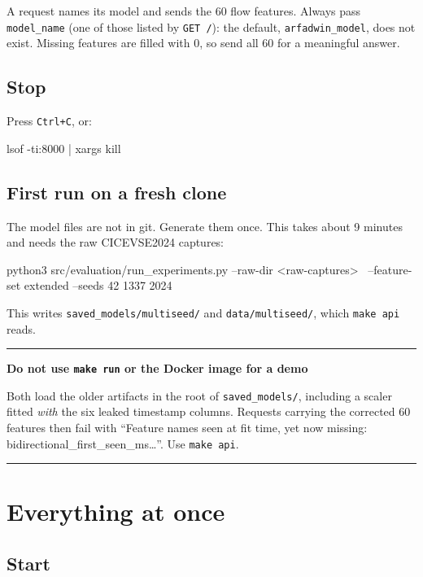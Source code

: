 \documentclass[11pt, a4paper]{article}
\newcommand{\fpath}[1]{\texttt{\small #1}}
\newenvironment{caution}[1]
  {\par\medskip\noindent\textcolor{alertred}{\rule{\textwidth}{0.8pt}}\par\nobreak
   \smallskip\noindent\textbf{\textcolor{alertred}{#1}}\par\nobreak\smallskip}
  {\par\smallskip\noindent\textcolor{alertred}{\rule{\textwidth}{0.8pt}}\par\medskip}
\begin{document}
A request names its model and sends the 60 flow features. Always pass
\texttt{model\_name} (one of those listed by \texttt{GET /}): the default,
\texttt{arfadwin\_model}, does not exist. Missing features are filled with 0, so
send all 60 for a meaningful answer.

\subsection{Stop}

Press \texttt{Ctrl+C}, or:

\begin{cmd}
lsof -ti:8000 | xargs kill
\end{cmd}

\subsection{First run on a fresh clone}
\label{sec:first-run}

The model files are not in git. Generate them once. This takes about 9 minutes
and needs the raw CICEVSE2024 captures:

\begin{cmd}
python3 src/evaluation/run_experiments.py --raw-dir <raw-captures> \
        --feature-set extended --seeds 42 1337 2024
\end{cmd}

This writes \fpath{saved\_models/multiseed/} and \fpath{data/multiseed/}, which
\texttt{make api} reads.

\begin{caution}{Do not use \texttt{make run} or the Docker image for a demo}
Both load the older artifacts in the root of \fpath{saved\_models/}, including a
scaler fitted \emph{with} the six leaked timestamp columns. Requests carrying the
corrected 60 features then fail with ``Feature names seen at fit time, yet now
missing: bidirectional\_first\_seen\_ms\ldots''. Use \texttt{make api}.
\end{caution}

\section{Everything at once}

\subsection{Start}
\end{document}
